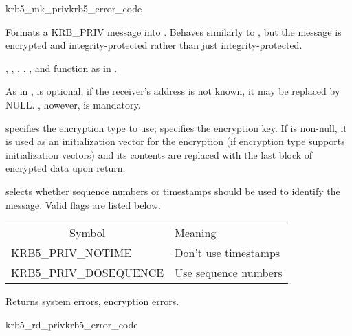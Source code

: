 \begin{funcdecl}{krb5_mk_priv}{krb5_error_code}{\funcin}
\funcinout
{}
\funcout
{}
\end{funcdecl}

Formats a KRB_PRIV message into .  Behaves similarly
to , but the message is encrypted and
integrity-protected rather than just integrity-protected.

, , ,
, ,  and
 function as in .

As in ,  is optional; if
the receiver's address is not known, it may be replaced by NULL.
, however, is mandatory.

 specifies the encryption type to use;
 specifies the encryption key.  If 
is non-null, it is used as an initialization vector for the encryption
(if encryption type  supports initialization vectors)
and its contents are replaced with the last block of encrypted data
upon return.

 selects whether sequence numbers or timestamps
should be used to identify the message.  Valid flags are listed below.

\begin{tabular}{ll}
\multicolumn{1}{c}{Symbol} & Meaning \\
KRB5_PRIV_NOTIME		& Don't use timestamps \\
KRB5_PRIV_DOSEQUENCE	& Use sequence numbers \\
\end{tabular}

Returns system errors, encryption errors.

\begin{funcdecl}{krb5_rd_priv}{krb5_error_code}{\funcin}
\funcinout
{}
\funcout
{}
\end{funcdecl}

